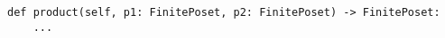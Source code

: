 \begin{verbatim}
def product(self, p1: FinitePoset, p2: FinitePoset) -> FinitePoset:
    ...
\end{verbatim}